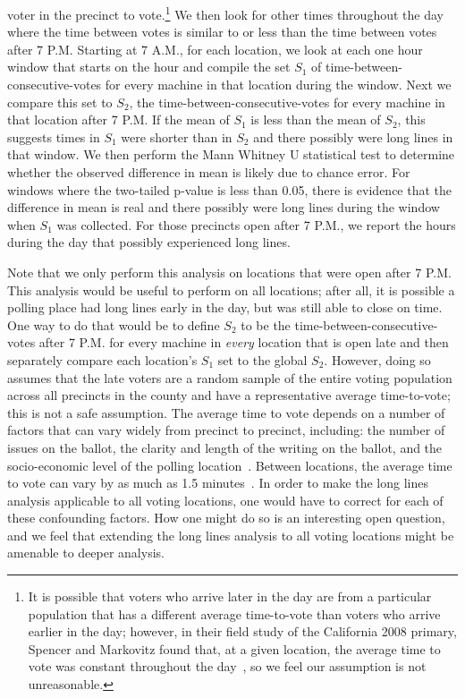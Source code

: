 \documentclass[letterpaper,twocolumn,10pt]{article}
\begin{document}
voter in the precinct to vote.\footnote{It is possible that voters who arrive later in
the day are from a particular population that has a different average
time-to-vote than voters who arrive earlier in the day; however, in their field
study of the California 2008 primary, Spencer and Markovitz found that, at a
given location, the
average time to vote was constant throughout the day~\cite{Spencer2010}, so we
feel our assumption is not unreasonable.} We 
then look for other times throughout the day where the time between votes is
similar to or less than the time between votes after 7 P.M. Starting at 7 A.M.,
for each location, we look at each one hour window that starts on the hour and
compile the set $S_1$ of time-between-consecutive-votes for every machine in
that location during the window. Next we compare this set to $S_2$, the
time-between-consecutive-votes for every machine in that location after 7
P.M. If the mean of $S_1$ is less than the mean of $S_2$, this suggests times in
$S_1$ were shorter than in $S_2$ and there possibly were long lines in that
window. We then perform the Mann Whitney U statistical test to determine whether
the observed difference in mean is likely due to chance error. For windows where the
two-tailed p-value is less than 0.05, there is evidence that the difference in
mean is real and there possibly were long lines during the window when $S_1$ was
collected. For those precincts open after 7 P.M., we report the hours during the
day that possibly experienced long lines.

Note that we only perform this analysis on locations that were open
after 7 P.M. This analysis would be useful to perform on all locations; after all, it is possible a polling place had long lines early in the day, but
was still able to close on time. One way to do that would be to define $S_2$ to
be the time-between-consecutive-votes after 7 P.M. for every machine in
\emph{every} location that is open late and then separately compare each location's $S_1$
set to the global $S_2$. However, doing so assumes that
the late voters are a random sample of the entire voting population across all
precincts in the county and have a representative average time-to-vote; this is
not a safe assumption. The average time to vote depends on a number of factors
that can vary widely from precinct to precinct, including: the number of issues
on the ballot, the clarity and length of the writing on the ballot, and the
socio-economic level of the polling location~\cite{Spencer2010,
  Allen2006}. Between locations, the average time to vote can vary by as much as
1.5 minutes~\cite{Spencer2010}. In order to make the long lines analysis
applicable to all voting locations, one would have to correct for each
of these confounding factors. How one might do so is an interesting open
question, and we feel that extending the long lines analysis to all voting locations
might be amenable to deeper analysis.
\end{document}
